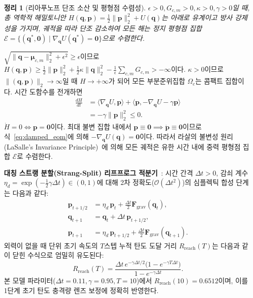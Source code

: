 \documentclass[journal]{IEEEtran}
\newtheorem{theorem}{정리}
\begin{document}
\begin{theorem}[리아푸노프 단조 소산 및 평형점 수렴성]
$\epsilon > 0, G_{c,m} > 0, \kappa > 0, \gamma > 0$일 때, 총 역학적 해밀토니안 $H(\mathbf{q}, \mathbf{p}) = \frac{1}{2}\|\mathbf{p}\|_2^2 + U(\mathbf{q})$는 아래로 유계이고 방사 강제성을 가지며, 궤적을 따라 단조 감소하여 모든 해는 정지 평형점 집합 $\mathcal{E} = \{(\mathbf{q}^*, \mathbf{0}) \mid \nabla_{\mathbf{q}} U(\mathbf{q}^*) = \mathbf{0}\}$으로 수렴한다.
\end{theorem}

\begin{IEEEproof}
$\sqrt{\|\mathbf{q}-\boldsymbol{\mu}_{c,m}\|_2^2+\epsilon^2} \ge \epsilon$이므로 $H(\mathbf{q}, \mathbf{p}) \ge \frac{1}{2}\|\mathbf{p}\|_2^2 + \frac{1}{2}\kappa\|\mathbf{q}\|_2^2 - \frac{1}{\epsilon}\sum_{c,m}G_{c,m} > -\infty$이다. $\kappa > 0$이므로 $\|(\mathbf{q}, \mathbf{p})\|_2 \to \infty$일 때 $H \to +\infty$가 되어 모든 부분준위집합 $\Omega_c$는 콤팩트 집합이다. 시간 도함수를 전개하면
\begin{equation}
\begin{aligned}
  \frac{dH}{dt} &= \langle \nabla_{\mathbf{q}} U, \mathbf{p} \rangle + \langle \mathbf{p}, -\nabla_{\mathbf{q}} U - \gamma \mathbf{p} \rangle \\
  &= -\gamma \|\mathbf{p}\|_2^2 \le 0.
\end{aligned}
\end{equation}
$\dot{H} = 0 \iff \mathbf{p} = \mathbf{0}$이다. 최대 불변 집합 내에서 $\mathbf{p} \equiv \mathbf{0} \implies \dot{\mathbf{p}} \equiv \mathbf{0}$이므로 식~\eqref{eq:damped_eom}에 의해 $-\nabla_{\mathbf{q}} U(\mathbf{q}) = \mathbf{0}$이다. 따라서 라살의 불변성 원리(LaSalle's Invariance Principle)~\cite{lasalle1976}에 의해 모든 궤적은 유한 시간 내에 중력 평형점 집합 $\mathcal{E}$로 수렴한다.
\end{IEEEproof}

\textbf{대칭 스트랭 분할(Strang-Split) 리프프로그 적분기}~\cite{strang1968}: 시간 간격 $\Delta t > 0$, 감쇠 계수 $\eta_d = \exp(-\frac{1}{2}\gamma\Delta t) \in (0, 1)$에 대해 2차 정확도($\mathcal{O}(\Delta t^2)$)의 심플렉틱 합성 단계는 다음과 같다:
\begin{align}
  \mathbf{p}_{t + 1/2} &= \eta_d \, \mathbf{p}_t + \frac{\Delta t}{2} \mathbf{F}_{\text{grav}}(\mathbf{q}_t), \nonumber \\
  \mathbf{q}_{t + 1} &= \mathbf{q}_t + \Delta t \, \mathbf{p}_{t + 1/2}, \label{eq:leapfrog_update} \\
  \mathbf{p}_{t + 1} &= \eta_d \, \mathbf{p}_{t + 1/2} + \frac{\Delta t}{2} \mathbf{F}_{\text{grav}}(\mathbf{q}_{t+1}). \nonumber
\end{align}
외력이 없을 때 단위 초기 속도의 $T$스텝 누적 탄도 도달 거리 $R_{\text{reach}}(T)$는 다음과 같이 닫힌 수식으로 엄밀히 유도된다:
\begin{equation}
  R_{\text{reach}}(T) = \frac{\Delta t \, e^{-\gamma\Delta t/2}\big(1 - e^{-\gamma T \Delta t}\big)}{1 - e^{-\gamma\Delta t}}.
  \label{eq:ballistic_reach}
\end{equation}
본 모델 파라미터($\Delta t = 0.11, \gamma = 0.95, T = 10$)에서 $R_{\text{reach}}(10) = 0.6512$이며, 이를 1단계 초기 탄도 충격량 렌즈 보정에 정확히 반영한다.
\end{document}
